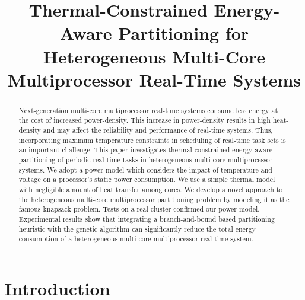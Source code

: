 \documentclass[conference]{IEEEtran}
\begin{document}
\title{\LARGE Thermal-Constrained Energy-Aware Partitioning for Heterogeneous Multi-Core Multiprocessor Real-Time Systems}

\author{
 }


\maketitle


\begin{abstract}
Next-generation multi-core multiprocessor real-time systems consume less energy at the cost of increased power-density. 
This increase in power-density results in high
heat-density and may affect the reliability and performance of real-time systems. Thus, incorporating maximum temperature
constraints in scheduling of real-time task sets is an important challenge.
This paper investigates thermal-constrained energy-aware %
partitioning of periodic real-time tasks in heterogeneous multi-core
multiprocessor systems. We adopt a power model which considers the impact of temperature and voltage on a processor's static power consumption. 
We use a simple thermal model with negligible amount of heat 
transfer among cores.
We develop a novel approach to the heterogeneous multi-core multiprocessor partitioning problem by modeling it as the famous knapsack problem. 
Tests on a real cluster confirmed our power model. 
Experimental results show that integrating a branch-and-bound based partitioning heuristic with the genetic algorithm %
can significantly 
reduce the  total energy consumption of a heterogeneous multi-core multiprocessor real-time system.
\end{abstract}


\section{Introduction}
\end{document}
